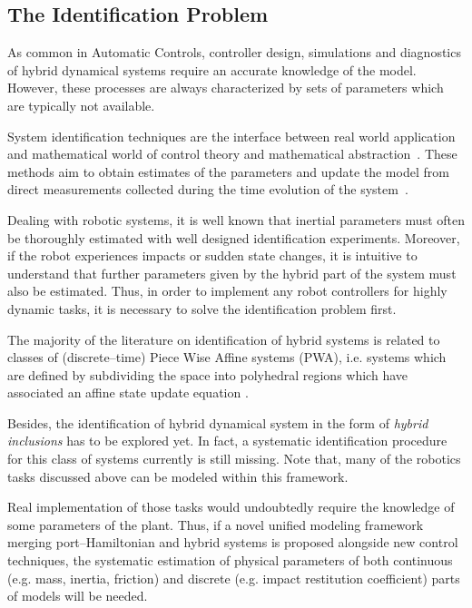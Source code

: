 \subsection{The Identification Problem}
%
As common in Automatic Controls, controller design, simulations and diagnostics of hybrid dynamical systems require an accurate knowledge of the model. However, these {processes} are always characterized by sets of parameters which are typically not available.
%
\newline

%
System identification techniques are the interface between real world application and mathematical world of control theory and mathematical abstraction~\citep{LJUNG20101}. These methods aim to obtain estimates of the parameters and update the model from direct measurements collected during the time evolution of the system~\citep{soderstrom2018errors,SODERSTROM2019}.
%
\newline

%
Dealing with robotic systems, it is well known that inertial parameters must often be thoroughly estimated with well designed identification experiments. Moreover, if the robot experiences impacts or sudden state changes, it is intuitive to understand that further parameters given by the hybrid part of the system must also be estimated. 
Thus, in order to implement any robot controllers for highly dynamic tasks, it is necessary to solve the identification problem first.
%
\newline

%
The majority of the literature on identification of hybrid systems is related to classes of (discrete--time) Piece Wise Affine systems (PWA), i.e. systems which are defined by subdividing the  space into polyhedral regions which have associated an affine state update equation \citep{Bemporad,Ferrari,Juloski,juloski2005bayesian,Paoletti}.
% 
\newline

%
Besides, the identification of hybrid dynamical system in the form of \textit{hybrid inclusions} has to be explored yet. In fact, a systematic identification procedure for this class of systems currently is still missing. Note that, many of the robotics tasks discussed above can be modeled within this framework.
%
\newline

%
Real implementation of those tasks would undoubtedly require the knowledge of some parameters of the plant. Thus, if a novel unified modeling framework merging port--Hamiltonian and hybrid systems is proposed alongside new control techniques, the systematic estimation of physical parameters of both continuous (e.g. mass, inertia, friction) and discrete (e.g. impact restitution coefficient) parts of models  will be needed.
%
\clearpage

